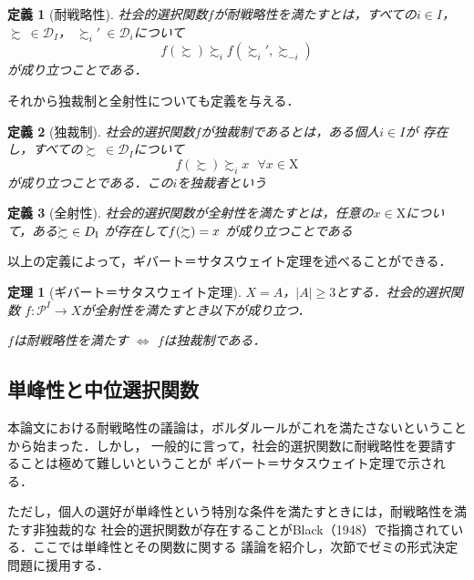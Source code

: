 \documentclass[dvipdfmx]{jsarticle}
\newtheorem*{THeorem}{定理}
\newtheorem*{DEfinition}{定義}
\begin{document}
\begin{DEfinition}[耐戦略性]
  社会的選択関数$f$が耐戦略性を満たすとは，すべての$i \in I$，$\succsim\ \in \mathcal{D}_I$，
  $\succsim_{i}'\ \in \mathcal{D}_i$について
  \[
    f(\succsim) \succsim_{i} f(\succsim_{i}',\succsim_{-i})
  \]
  が成り立つことである．
\end{DEfinition}

それから独裁制と全射性についても定義を与える．

\begin{DEfinition}[独裁制]
  社会的選択関数$f$が独裁制であるとは，ある個人$i \in I$が
  存在し，すべての$\succsim\  \in \mathcal{D}_I$について
  \[
    f(\succsim)\succsim_i x\hspace{8pt} \forall x \in \mathrm{X}  
  \]
  が成り立つことである．この$i$を独裁者という
\end{DEfinition}

\begin{DEfinition}[全射性]
  社会的選択関数が全射性を満たすとは，任意の$x \in \mathrm{X}$について，ある$\succsim \ \in \mathnormal{D}_{\mathrm{I}}$
  が存在して$\mathnormal{f}(\succsim) = x$
  が成り立つことである
\end{DEfinition}

以上の定義によって，ギバート＝サタスウェイト定理を述べることができる．

\begin{THeorem}[ギバート＝サタスウェイト定理]
  $X = A$，$|A| \geq 3$とする．社会的選択関数
  $f\colon \mathcal{P}^{I} \to X$が全射性を満たすとき以下が成り立つ．
  \begin{center}
    $f$は耐戦略性を満たす $\Leftrightarrow$ $f$は独裁制である．
  \end{center}
\end{THeorem}


\subsection{単峰性と中位選択関数}\label{subsec:単峰性と中位選択関数}
本論文における耐戦略性の議論は，ボルダルールがこれを満たさないということから始まった．しかし，
一般的に言って，社会的選択関数に耐戦略性を要請することは極めて難しいということが
ギバート＝サタスウェイト定理で示される．

ただし，個人の選好が単峰性という特別な条件を満たすときには，耐戦略性を満たす非独裁的な
社会的選択関数が存在することがBlack（1948）で指摘されている．ここでは単峰性とその関数に関する
議論を紹介し，次節でゼミの形式決定問題に援用する．
\end{document}
